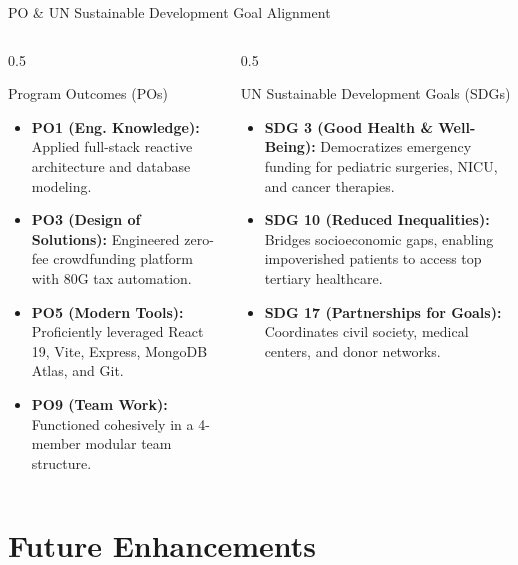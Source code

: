 \documentclass[aspectratio=169, 10pt]{beamer}
\begin{document}
\begin{frame}{PO \& UN Sustainable Development Goal Alignment}
  \begin{columns}[T]
    \begin{column}{0.5\textwidth}
      \begin{block}{Program Outcomes (POs)}
        \begin{itemize}
          \item \textbf{PO1 (Eng. Knowledge):} Applied full-stack reactive architecture and database modeling.
          \item \textbf{PO3 (Design of Solutions):} Engineered zero-fee crowdfunding platform with 80G tax automation.
          \item \textbf{PO5 (Modern Tools):} Proficiently leveraged React 19, Vite, Express, MongoDB Atlas, and Git.
          \item \textbf{PO9 (Team Work):} Functioned cohesively in a 4-member modular team structure.
        \end{itemize}
      \end{block}
    \end{column}
    \begin{column}{0.5\textwidth}
      \begin{exampleblock}{UN Sustainable Development Goals (SDGs)}
        \begin{itemize}
          \item \textbf{SDG 3 (Good Health \& Well-Being):} Democratizes emergency funding for pediatric surgeries, NICU, and cancer therapies.
          \item \textbf{SDG 10 (Reduced Inequalities):} Bridges socioeconomic gaps, enabling impoverished patients to access top tertiary healthcare.
          \item \textbf{SDG 17 (Partnerships for Goals):} Coordinates civil society, medical centers, and donor networks.
        \end{itemize}
      \end{exampleblock}
    \end{column}
  \end{columns}
\end{frame}

\section{Future Enhancements}
\end{document}
